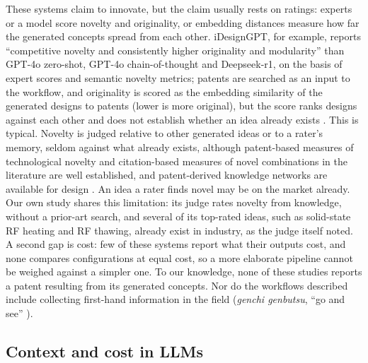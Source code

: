 These systems claim to innovate, but the claim usually rests on ratings: experts or a model score novelty and originality, or embedding distances measure how far the generated concepts spread from each other. iDesignGPT, for example, reports ``competitive novelty and consistently higher originality and modularity'' than GPT-4o zero-shot, GPT-4o chain-of-thought and Deepseek-r1, on the basis of expert scores and semantic novelty metrics; patents are searched as an input to the workflow, and originality is scored as the embedding similarity of the generated designs to patents (lower is more original), but the score ranks designs against each other and does not establish whether an idea already exists \citep{Liu2026}. This is typical. Novelty is judged relative to other generated ideas or to a rater's memory, seldom against what already exists, although patent-based measures of technological novelty \citep{Fleming2001,Verhoeven2016} and citation-based measures of novel combinations in the literature \citep{Uzzi2013} are well established, and patent-derived knowledge networks are available for design \citep{Sarica2020,Luo2021}. An idea a rater finds novel may be on the market already. Our own study shares this limitation: its judge rates novelty from knowledge, without a prior-art search, and several of its top-rated ideas, such as solid-state RF heating and RF thawing, already exist in industry, as the judge itself noted. A second gap is cost: few of these systems report what their outputs cost, and none compares configurations at equal cost, so a more elaborate pipeline cannot be weighed against a simpler one. To our knowledge, none of these studies reports a patent resulting from its generated concepts. Nor do the workflows described include collecting first-hand information in the field (\emph{genchi genbutsu}, ``go and see'' \citep{berengueres2014}).

\subsection{Context and cost in LLMs}

